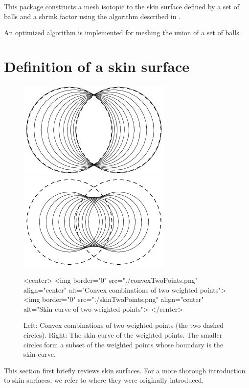 This package constructs a mesh isotopic to the skin surface defined by
a set of balls and a shrink factor using the algorithm described in
\cite{cgal:kv-mssct-05}. %

An optimized algorithm is implemented for meshing the union of a set
of balls.

\section{Definition of a skin surface\label{sec:skindefinition}}

\begin{figure}
  \begin{ccTexOnly}
    \begin{center}
      \includegraphics[width=.25\textwidth]{Skin_surface_3/convexTwoPoints}
      \includegraphics[width=.25\textwidth]{Skin_surface_3/skinTwoPoints}
    \end{center}
  \end{ccTexOnly}
  \begin{ccHtmlOnly}
    <center>
    <img border="0" src="./convexTwoPoints.png" align="center" alt="Convex combinations of two weighted points">
    <img border="0" src="./skinTwoPoints.png" align="center" alt="Skin
    curve of two weighted points">
    </center>
  \end{ccHtmlOnly}
  \caption{\label{fig:twoPoints} Left: Convex combinations of two
    weighted points (the two dashed circles). Right: The skin curve of
    the weighted points. The smaller circles form a subset of the
    weighted points whose boundary is the skin curve.}
\end{figure}

This section first briefly reviews skin surfaces. For a more thorough
introduction to skin surfaces, we refer to \cite{cgal:e-dssd-99} where
they were originally introduced.

